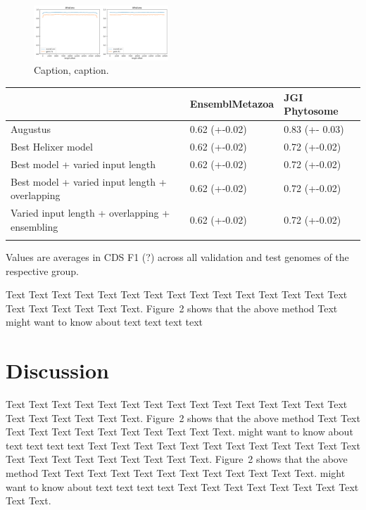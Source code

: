 \documentclass{bioinfo}
\begin{document}
\begin{figure}[!tpb]
	\centerline{\includegraphics[width=0.45\textwidth]{images/length_wise_bias}}
\caption{Caption, caption.}\label{fig:length_wise_bias}
\end{figure}


\begin{table}[!t]
 {
\begin{tabular}{@{}lll@{}}
\toprule & EnsemblMetazoa & JGI Phytosome\\
\midrule
Augustus & 0.62 (+-0.02) & 0.83 (+- 0.03)\\
Best Helixer model & 0.62 (+-0.02) & 0.72 (+-0.02) \\
Best model + varied input length & 0.62 (+-0.02) & 0.72 (+-0.02) \\
Best model + varied input length + overlapping & 0.62 (+-0.02) & 0.72 (+-0.02) \\
Varied input length + overlapping + ensembling & 0.62 (+-0.02) & 0.72 (+-0.02) \\
\botrule
\end{tabular}}{Values are averages in CDS F1 (?) across all validation and test genomes of the \\ respective group.}
\end{table}

Text Text Text Text Text Text  Text Text Text Text Text Text Text
Text Text  Text Text Text Text Text Text.
Figure~2\vphantom{\ref{fig:02}} shows that the above method  Text
\citealp{Boffelli03} might want to know about  text text text text


\section{Discussion}

Text Text Text Text Text Text  Text Text Text Text Text Text Text
Text Text  Text Text Text Text Text Text.
Figure~2\vphantom{\ref{fig:02}} shows that the above method  Text
Text Text Text  Text Text Text Text Text Text  Text Text.
\citealp{Boffelli03} might want to know about  text text text text
Text Text Text Text Text Text  Text Text Text Text Text Text Text
Text Text  Text Text Text Text Text Text.
Figure~2\vphantom{\ref{fig:02}} shows that the above method  Text
Text Text Text  Text Text Text Text Text Text  Text Text.
\citealp{Boffelli03} might want to know about  text text text text
Text Text Text Text Text Text Text Text Text Text.
\end{document}
